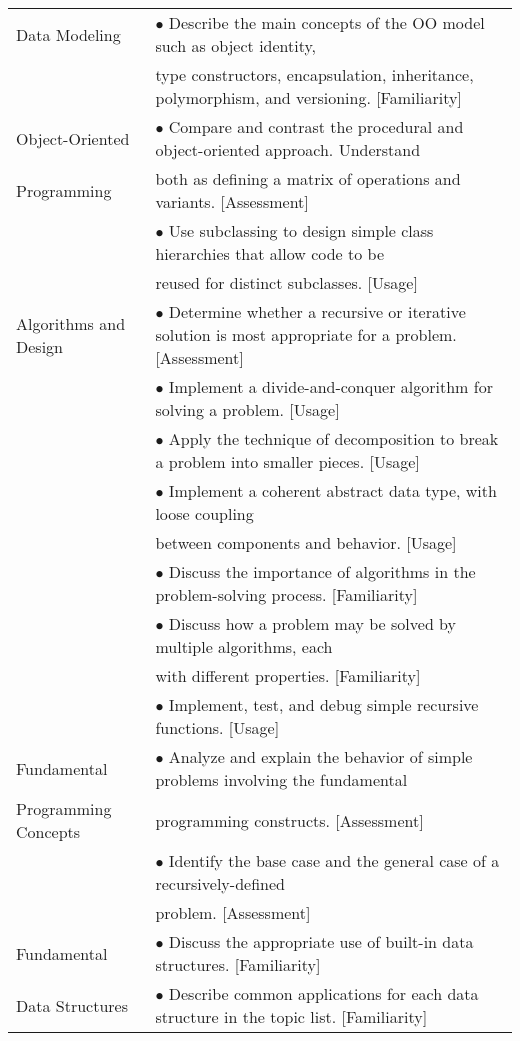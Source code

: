 \documentclass[10pt]{article}
\begin{document}
\begin{longtable}{|p{1.5in}|p{5.25in}|}
\hline
Data Modeling & \(\bullet\) Describe the main concepts of the OO model such as object identity,\\
 & type constructors, encapsulation, inheritance, polymorphism, and versioning. [Familiarity]\\
\hline
Object-Oriented & \(\bullet\) Compare and contrast the procedural and object-oriented approach. Understand\\
Programming & both as defining a matrix of operations and variants. [Assessment]\\
 & \(\bullet\) Use subclassing to design simple class hierarchies that allow code to be\\
 & reused for distinct subclasses. [Usage]\\
\hline
Algorithms and Design & \(\bullet\) Determine whether a recursive or iterative solution is most appropriate for a problem. [Assessment]\\
 & \(\bullet\) Implement a divide-and-conquer algorithm for solving a problem. [Usage]\\
 & \(\bullet\) Apply the technique of decomposition to break a problem into smaller pieces. [Usage]\\
 & \(\bullet\) Implement a coherent abstract data type, with loose coupling\\
 & between components and behavior. [Usage]\\
 & \(\bullet\) Discuss the importance of algorithms in the problem-solving process. [Familiarity]\\
 & \(\bullet\) Discuss how a problem may be solved by multiple algorithms, each\\
 & with different properties. [Familiarity]\\
 & \(\bullet\) Implement, test, and debug simple recursive functions. [Usage]\\
\hline
Fundamental & \(\bullet\) Analyze and explain the behavior of simple problems involving the fundamental\\
Programming Concepts & programming constructs. [Assessment]\\
 & \(\bullet\) Identify the base case and the general case of a recursively-defined\\
 & problem. [Assessment]\\
\hline
Fundamental & \(\bullet\) Discuss the appropriate use of built-in data structures. [Familiarity]\\
Data Structures & \(\bullet\) Describe common applications for each data structure in the topic list. [Familiarity]\\

\end{longtable}
\end{document}
